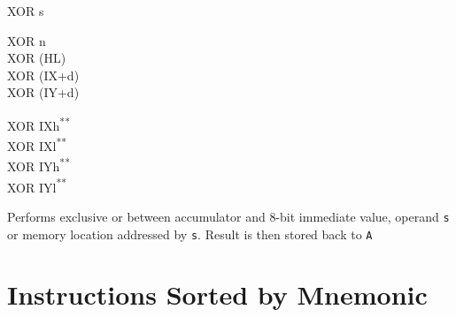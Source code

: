 \documentclass[12pt,twoside,openright,a4paper]{book}
\newcommand{\UNDOC}{\textnormal{\textsuperscript{**}}}
\begin{document}
\begin{basedescript}{
	\desclabelstyle{\multilinelabel}
	\desclabelwidth{3cm}}
\begin{detailitem}{XOR s}
\begin{DetailVariants}
			\columnbreak
			XOR n\\
			XOR (HL)\\
			XOR (IX+d)\\
			XOR (IY+d)

			\columnbreak
			XOR IXh\UNDOC\\
			XOR IXl\UNDOC\\
			XOR IYh\UNDOC\\
			XOR IYl\UNDOC
		\end{DetailVariants}

		Performs exclusive or between accumulator and 8-bit immediate value, operand {\tt s} or memory location addressed by {\tt s}. Result is then stored back to {\tt A}

		\begin{DetailEffects}[p]
		\end{DetailEffects}
						
		\begin{DetailTiming}
		\end{DetailTiming}

	\end{detailitem}

\end{basedescript}



\appendix


\chapter{Instructions Sorted by Mnemonic}
\end{document}
